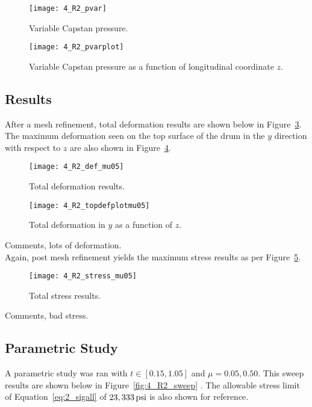 \begin{figure}[H]
	\centering
	\texttt{[image: 4\_R2\_pvar]}
	\caption{Variable Capstan pressure.}
	\label{fig:4_R2_pvar}
\end{figure}
\begin{figure}[H]
	\centering
	\texttt{[image: 4\_R2\_pvarplot]}
	\caption{Variable Capstan pressure as a function of longitudinal coordinate $z$.}
	\label{fig:4_R2_pvarplot}
\end{figure}


\subsection{Results}

After a mesh refinement, total deformation results are shown below in Figure~\ref{fig:4_R2_def_mu05}. The maximum deformation seen on the top surface of the drum in the $y$ direction with respect to $z$ are also shown in Figure~\ref{fig:4_R2_topdefplotmu05}.

\begin{figure}[H]
	\centering
	\texttt{[image: 4\_R2\_def\_mu05]}
	\caption{Total deformation results.}
	\label{fig:4_R2_def_mu05}
\end{figure}
\begin{figure}[H]
	\centering
	\texttt{[image: 4\_R2\_topdefplotmu05]}
	\caption{Total deformation in $y$ as a function of $z$.}
	\label{fig:4_R2_topdefplotmu05}
\end{figure}

Comments, lots of deformation.\\

Again, post mesh refinement yields the maximum stress results as per Figure~\ref{fig:4_R2_stress_mu05}.

\begin{figure}[H]
	\centering
	\texttt{[image: 4\_R2\_stress\_mu05]}
	\caption{Total stress results.}
	\label{fig:4_R2_stress_mu05}
\end{figure}

Comments, bad stress.


\subsection{Parametric Study}

A parametric study was ran with  $t\in [0.15, 1.05]$ and $\mu =0.05, 0.50$. This sweep results are shown below in Figure~\ref{fig:4_R2_sweep} \cite{EXCEL}.  The allowable stress limit of Equation~\ref{eq:2_sigall} of $23,333 \,\mathrm{psi}$ is also shown for reference.

